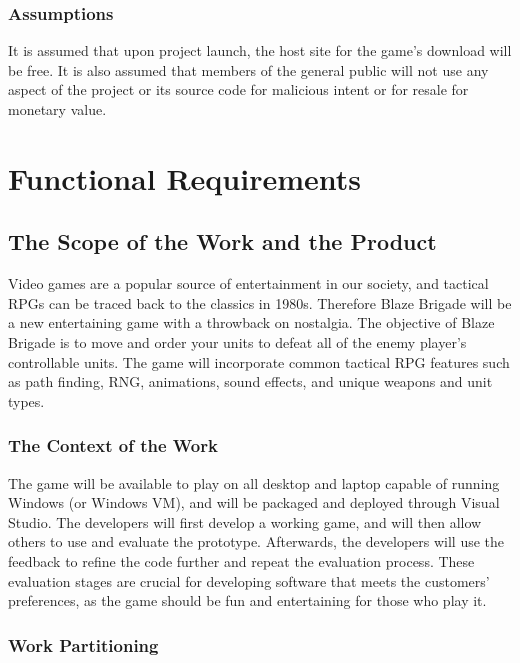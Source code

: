 \documentclass{article}
\begin{document}
\subsubsection{Assumptions}
It is assumed that upon project launch, the host site for the game's download will be free. It is also assumed that members of the general public will not use any aspect of the project or its source code for malicious intent or for resale for monetary value.

\section{Functional Requirements}

\subsection{The Scope of the Work and the Product}
Video games are a popular source of entertainment in our society, and tactical RPGs can be traced back to the classics in 1980s. Therefore Blaze Brigade will be a new entertaining game with a throwback on nostalgia. The objective of Blaze Brigade is to move and order your units to defeat all of the enemy player's controllable units. The game will incorporate common tactical RPG features such as path finding, RNG, animations, sound effects, and unique weapons and unit types. 

\subsubsection{The Context of the Work}
The game will be available to play on all desktop and laptop capable of running Windows (or Windows VM), and will be packaged and deployed through Visual Studio. The developers will first develop a working game, and will then allow others to use and evaluate the prototype. Afterwards, the developers will use the feedback to refine the code further and repeat the evaluation process. These evaluation stages are crucial for developing software that meets the customers' preferences, as the game should be fun and entertaining for those who play it.

\subsubsection{Work Partitioning}
\end{document}
